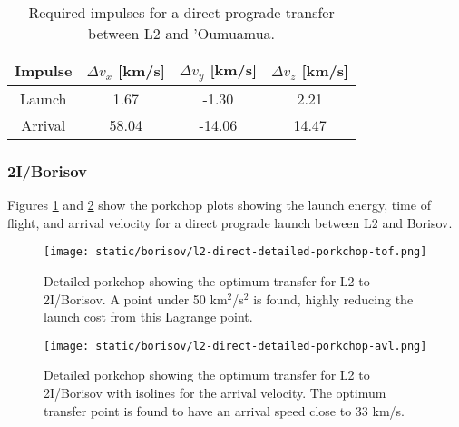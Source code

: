 \vspace{1cm}
\begin{table}[H]
  \centering
  \begin{tabular}{|c|c|c|c|}
    \hline
    Impulse & $\Delta v_x$ [km/s] & $\Delta v_y$ [km/s] & $\Delta v_z$ [km/s] \\
    \hline
    Launch  & 1.67                & -1.30               & 2.21                \\
    \hline
    Arrival & 58.04               & -14.06              & 14.47               \\
    \hline
  \end{tabular}
  \caption[Required impulses for a direct prograde transfer between L2 and
    'Oumuamua]{Required impulses for a direct prograde transfer between L2 and
    'Oumuamua.}
  \label{tab:l2-oumuamua-direct-transfer-impulses}
\end{table}


\subsubsection{2I/Borisov}

Figures \ref{fig:l2-borisov-optimum-porkchop} and
\ref{fig:l2-borisov-optimum-porkchop-avl} show the porkchop plots showing the
launch energy, time of flight, and arrival velocity for a direct prograde launch
between L2 and Borisov.

\begin{figure}[H]
  \centering
  \texttt{[image: static/borisov/l2-direct-detailed-porkchop-tof.png]}
  \caption[Detailed porkchop showing the optimum transfer for
    L2 to 2I/Borisov with the time of flight.]{Detailed porkchop showing the optimum transfer for
    L2 to 2I/Borisov. A point under 50 km$^2$/s$^2$ is found, highly
    reducing the launch cost from this Lagrange point.
  }
  \label{fig:l2-borisov-optimum-porkchop}
\end{figure}

\begin{figure}[H]
  \centering
  \texttt{[image: static/borisov/l2-direct-detailed-porkchop-avl.png]}
  \caption[Detailed porkchop showing the optimum transfer for
    L2 to 2I/Borisov with the arrival velocity.]{Detailed porkchop showing the
    optimum transfer for L2 to 2I/Borisov with isolines for the arrival
    velocity. The optimum transfer point is found to have an arrival speed
    close to 33 km/s.}
  \label{fig:l2-borisov-optimum-porkchop-avl}
\end{figure}

